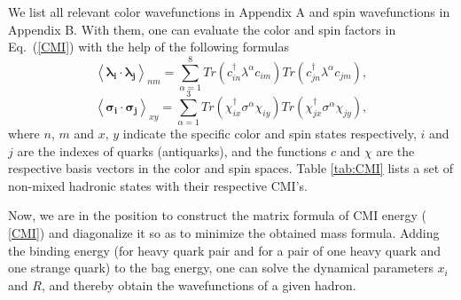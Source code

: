 \documentclass[12pt,prd,onecolumn,floatfix,nofootinbib]{revtex4}
\begin{document}
We list all relevant color wavefunctions in Appendix A and spin
wavefunctions in Appendix B. With them, one can evaluate the color and spin
factors in Eq.~(\ref{CMI}) with the help of the following formulas
\begin{equation}
{\left\langle \boldsymbol{\lambda _{i}}\cdot \boldsymbol{\lambda _{j}}%
\right\rangle }_{nm}=\sum_{\alpha =1}^{8}Tr\left( c_{in}^{\dagger }\lambda
^{\alpha }c_{im}\right) Tr\left( c_{jn}^{\dagger }\lambda ^{\alpha
}c_{jm}\right) ,  \label{colorfc}
\end{equation}%
\begin{equation}
{\left\langle \boldsymbol{\sigma _{i}}\cdot \boldsymbol{\sigma _{j}}%
\right\rangle }_{xy}=\sum_{\alpha =1}^{3}Tr\left( \chi _{ix}^{\dagger
}\sigma ^{\alpha }\chi _{iy}\right) Tr\left( \chi _{jx}^{\dagger }\sigma
^{\alpha }\chi _{jy}\right) ,  \label{spinfc}
\end{equation}%
where $n$, $m$ and $x$, $y$ indicate the specific color and spin states
respectively, $i$ and $j$ are the indexes of quarks (antiquarks), and the
functions $c$ and $\chi $ are the respective basis vectors in the color and
spin spaces. Table \ref{tab:CMI} lists a set of non-mixed hadronic states
with their respective CMI's.

Now, we are in the position to construct the matrix formula of CMI energy (%
\ref{CMI}) and diagonalize it so as to minimize the obtained mass formula.
Adding the binding energy (for heavy quark pair and for a pair of one heavy
quark and one strange quark) to the bag energy, one can solve the dynamical
parameters $x_{i}$ and $R$, and thereby obtain the wavefunctions of a given
hadron.
\end{document}
